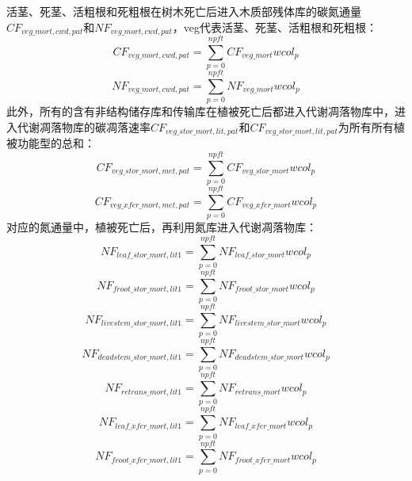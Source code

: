 活茎、死茎、活粗根和死粗根在树木死亡后进入木质部残体库的碳氮通量$CF_{veg\_{mort},cwd,pat}$和$NF_{veg\_{mort},cwd,pat}$，veg代表活茎、死茎、活粗根和死粗根：
\begin{equation}
  CF_{veg\_{mort},cwd,pat}=\sum_{p=0}^{npft}{CF_{veg\_{mort}}{wcol_p}}
\end{equation}
\begin{equation}
  NF_{veg\_{mort},cwd,pat}=\sum_{p=0}^{npft}{NF_{veg\_{mort}}{wcol_p}}
\end{equation}
此外，所有的含有非结构储存库和传输库在植被死亡后都进入代谢凋落物库中，进入代谢凋落物库的碳凋落速率$CF_{veg\_{{stor}\_{mort}},lit,pat}$和$CF_{veg\_{{stor}\_{mort}},lit,pat}$为所有所有植被功能型的总和：
\begin{equation}
  CF_{veg\_{{stor}\_{mort,met,pat}}}=\sum_{p=0}^{npft}{CF_{veg\_{{stor}\_{mort}}}{wcol_p}}
\end{equation}
\begin{equation}
  CF_{veg\_{xfer\_{mort,met,pat}}}=\sum_{p=0}^{npft}{CF_{veg\_{{xfer\_{mort}}}}{wcol_p}}
\end{equation}
对应的氮通量中，植被死亡后，再利用氮库进入代谢凋落物库：
\begin{equation}
  NF_{leaf\_{{stor}\_{mort}},lit1}=\sum_{p=0}^{npft}{NF_{leaf\_{{stor}\_{mort}}}{wcol_p}}
\end{equation}
\begin{equation}
  NF_{froot\_{{stor}\_{mort}},lit1}=\sum_{p=0}^{npft}{NF_{froot\_{{stor}\_{mort}}}{wcol_p}}
\end{equation}
\begin{equation}
  NF_{livestem\_{{stor}\_{mort}},lit1}=\sum_{p=0}^{npft}{NF_{livestem\_{{stor}\_{mort}}}{wcol_p}}
\end{equation}
\begin{equation}
  NF_{deadstem\_{{stor}\_{mort}},lit1}=\sum_{p=0}^{npft}{NF_{deadstem\_{{stor}\_{mort}}}{wcol_p}}
\end{equation}
\begin{equation}
  NF_{retrans\_{mort,lit1}}=\sum_{p=0}^{npft}{NF_{retrans\_{mort}}{wcol_p}}
\end{equation}
\begin{equation}
  NF_{leaf\_{{xfer}\_{mort,lit1}}}=\sum_{p=0}^{npft}{NF_{{leaf}\_{xfer\_{mort}}}{wcol_p}}
\end{equation}
\begin{equation}
  NF_{froot\_{xfer\_{mort,lit1}}}=\sum_{p=0}^{npft}{NF_{froot\_{xfer\_{mort}}}}{wcol_p}
\end{equation}
